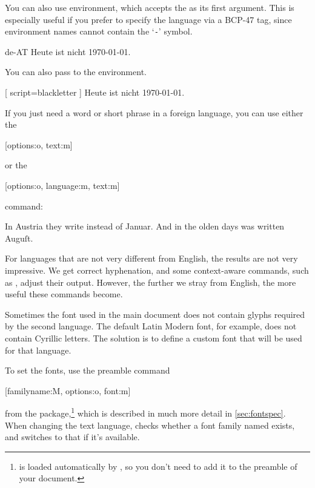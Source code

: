 You can also use  environment, which accepts the  as its
first argument. This is especially useful if you prefer to specify the language
via a BCP-47 tag, since environment names cannot contain the
\enquote*{\texttt{-}} symbol.
\begin{example}
\begin{lang}{de-AT}
  Heute ist nicht \today.
\end{lang}
\end{example}

You can also pass  to the environment.
\begin{example}
\begin{german}[
  script=blackletter
]
  Heute ist nicht \today.
\end{german}
\end{example}

If you just need a word or short phrase in a foreign language, you can use
either the
\begin{lscommand}
  [options:o, text:m]
\end{lscommand}
or the
\begin{lscommand}
  [options:o, language:m, text:m]
\end{lscommand}
command:
\begin{example}[examplewidth=0.8\linewidth, vertical_mode]
In Austria they write
instead of \textgerman{Januar}. And in the olden
days  was written
\textgerman[script=blackletter]{Auguſt}.
\end{example}

For languages that are not very different from English, the results are not
very impressive. We get correct hyphenation, and some context-aware commands,
such as , adjust their output. However, the further we stray from
English, the more useful these commands become.

Sometimes the font used in the main document does not contain glyphs required
by the second language. The default Latin Modern font, for example, does
not contain Cyrillic letters. The solution is to define a custom font that will
be used for that language.

To set the fonts, use the preamble command
\begin{lscommand}
  [familyname:M, options:o, font:m]
\end{lscommand}
from the  package,\footnote{ is loaded automatically
  by , so you don't need to add it to the preamble of your
  document.} which is described in much more detail in
\autoref{sec:fontspec}.
When changing the text language,  checks whether a font family
named  exists, and switches to that if it's
available.

